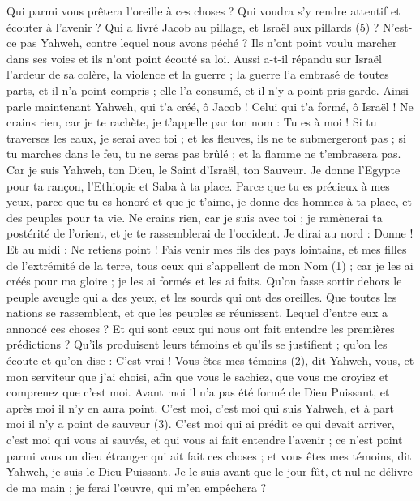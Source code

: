 \begin{multicols}{2}
Qui parmi vous prêtera l'oreille à ces choses ? Qui voudra s’y rendre attentif et écouter à l’avenir ?
Qui a livré Jacob au pillage, et Israël aux pillards (5) ? N'est-ce pas Yahweh, contre lequel nous avons péché ? Ils n’ont point voulu marcher dans ses voies et ils n’ont point écouté sa loi.
Aussi a-t-il répandu sur Israël l’ardeur de sa colère, la violence et la guerre ; la guerre l’a embrasé de toutes parts, et il n’a point compris ; elle l’a consumé, et il n’y a point pris garde.
\VerseOne{}Ainsi parle maintenant Yahweh, qui t'a créé, ô Jacob ! Celui qui t'a formé, ô Israël ! Ne crains rien, car je te rachète, je t’appelle par ton nom : Tu es à moi !
Si tu traverses les eaux, je serai avec toi ; et les fleuves, ils ne te submergeront pas ; si tu marches dans le feu, tu ne seras pas brûlé ; et la flamme ne t'embrasera pas.
Car je suis Yahweh, ton Dieu, le Saint d'Israël, ton Sauveur. Je donne l'Egypte pour ta rançon, l’Ethiopie et Saba à ta place.
Parce que tu es précieux à mes yeux, parce que tu es honoré et que je t’aime, je donne des hommes à ta place, et des peuples pour ta vie.
Ne crains rien, car je suis avec toi ; je ramènerai ta postérité de l’orient, et je te rassemblerai de l’occident.
Je dirai au nord : Donne ! Et au midi : Ne retiens point ! Fais venir mes fils des pays lointains, et mes filles de l’extrémité de la terre,
tous ceux qui s’appellent de mon Nom (1) ; car je les ai créés pour ma gloire ; je les ai formés et les ai faits.
Qu’on fasse sortir dehors le peuple aveugle qui a des yeux, et les sourds qui ont des oreilles.
Que toutes les nations se rassemblent, et que les peuples se réunissent. Lequel d'entre eux a annoncé ces choses ? Et qui sont ceux qui nous ont fait entendre les premières prédictions ? Qu'ils produisent leurs témoins et qu'ils se justifient ; qu'on les écoute et qu’on dise : C’est vrai !
Vous êtes mes témoins (2), dit Yahweh, vous, et mon serviteur que j'ai choisi, afin que vous le sachiez, que vous me croyiez et comprenez que c'est moi. Avant moi il n’a pas été formé de Dieu Puissant, et après moi il n'y en aura point.
C'est moi, c'est moi qui suis Yahweh, et à part moi il n'y a point de sauveur (3).
C'est moi qui ai prédit ce qui devait arriver, c'est moi qui vous ai sauvés, et qui vous ai fait entendre l'avenir ; ce n’est point parmi vous un dieu étranger qui ait fait ces choses ; et vous êtes mes témoins, dit Yahweh, je suis le Dieu Puissant.
Je le suis avant que le jour fût, et nul ne délivre de ma main ; je ferai l’œuvre, qui m'en empêchera ?

\end{multicols}
